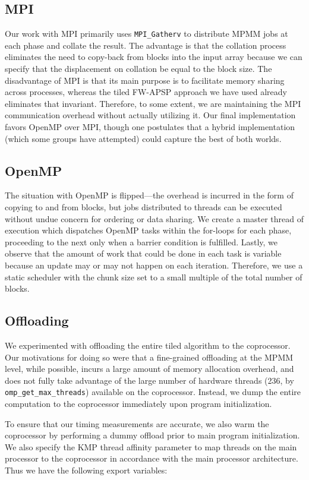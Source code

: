 \documentclass{scrartcl}
\begin{document}
  \subsection{MPI}
  Our work with MPI primarily uses \texttt{MPI\_Gatherv} to distribute MPMM jobs at each phase and collate the result. The advantage is that the collation process eliminates the need to copy-back from blocks into the input array because we can specify that the displacement on collation be equal to the block size. The disadvantage of MPI is that its main purpose is to facilitate memory sharing across processes, whereas the tiled FW-APSP approach we have used already eliminates that invariant. Therefore, to some extent, we are maintaining the MPI communication overhead without actually utilizing it. Our final implementation favors OpenMP over MPI, though one postulates that a hybrid implementation (which some groups have attempted) could capture the best of both worlds.

  \subsection{OpenMP}
  The situation with OpenMP is flipped---the overhead is incurred in the form of copying to and from blocks, but jobs distributed to threads can be executed without undue concern for ordering or data sharing. We create a master thread of execution which dispatches OpenMP tasks within the for-loops for each phase, proceeding to the next only when a barrier condition is fulfilled. Lastly, we observe that the amount of work that could be done in each task is variable because an update may or may not happen on each iteration. Therefore, we use a static scheduler with the chunk size set to a small multiple of the total number of blocks.

  \subsection{Offloading}
  We experimented with offloading the entire tiled algorithm to the coprocessor. Our motivations for doing so were that a fine-grained offloading at the MPMM level, while possible, incurs a large amount of memory allocation overhead, and does not fully take advantage of the large number of hardware threads (236, by \texttt{omp\_get\_max\_threads}) available on the coprocessor. Instead, we dump the entire computation to the coprocessor immediately upon program initialization.

  To ensure that our timing measurements are accurate, we also warm the coprocessor by performing a dummy offload prior to main program initialization. We also specify the KMP thread affinity parameter to map threads on the main processor to the coprocessor in accordance with the main processor architecture. Thus we have the following export variables:
\end{document}
